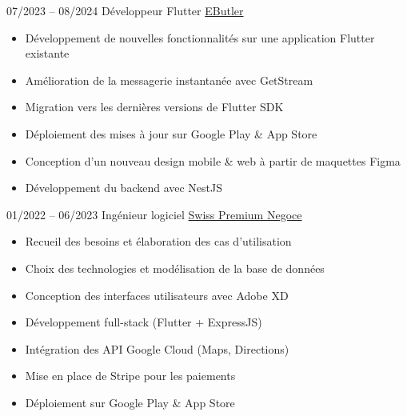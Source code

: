 \documentclass[9pt]{developercv} %
\begin{document}
\vspace{10 pt}
\begin{entrylist}
    \entry
    {07/2023 -- 08/2024}
    {Développeur Flutter}
    {\href{https://www.e-butler.com}{EButler}}
    {\vspace{-10pt}
        \begin{itemize}[noitemsep,topsep=0pt,parsep=0pt,partopsep=0pt, leftmargin=-1pt]
            \item Développement de nouvelles fonctionnalités sur une application Flutter existante
            \item Amélioration de la messagerie instantanée avec GetStream
            \item Migration vers les dernières versions de Flutter SDK
            \item Déploiement des mises à jour sur Google Play \& App Store
            \item Conception d'un nouveau design mobile \& web à partir de maquettes Figma
            \item Développement du backend avec NestJS
        \end{itemize}
        }
    \entry
    {01/2022 -- 06/2023}
    {Ingénieur logiciel}
    {\href{https://www.swisspremiumnegoce.com}{Swiss Premium Negoce}}
    {\vspace{-10pt}


        \begin{itemize}[noitemsep,topsep=0pt,parsep=0pt,partopsep=0pt, leftmargin=-1pt]
            \item Recueil des besoins et élaboration des cas d'utilisation
            \item Choix des technologies et modélisation de la base de données
            \item Conception des interfaces utilisateurs avec Adobe XD
            \item Développement full-stack (Flutter + ExpressJS)
            \item Intégration des API Google Cloud (Maps, Directions)
            \item Mise en place de Stripe pour les paiements
            \item Déploiement sur Google Play \& App Store
        \end{itemize}
        }
\end{entrylist}
\end{document}
